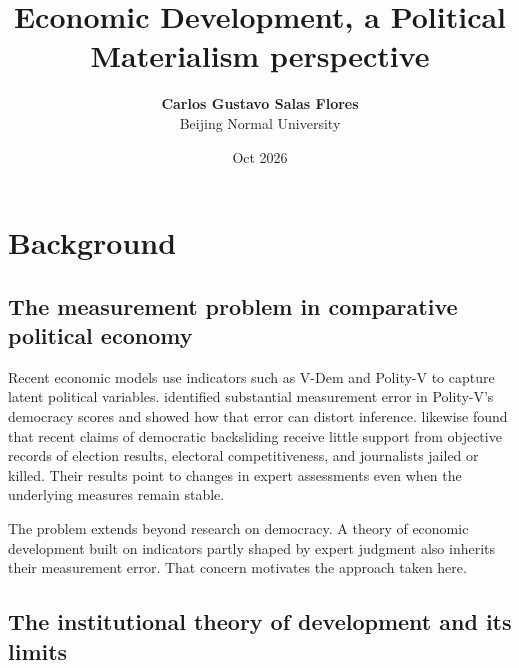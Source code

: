 \documentclass[11pt]{article}
\title{\textbf{Economic Development, a Political Materialism perspective}}
\author{\textbf{Carlos Gustavo Salas Flores} \\ \small Beijing Normal University}
\date{Oct 2026}
\begin{document}
\maketitle

\section{Background}
\label{sec:background}

\subsection{The measurement problem in comparative political economy}

Recent economic models use indicators such as V-Dem and Polity-V to capture latent political variables. \textcite{treier_jackman_2008} identified substantial measurement error in Polity-V's democracy scores and showed how that error can distort inference. \textcite{little_meng_2024} likewise found that recent claims of democratic backsliding receive little support from objective records of election results, electoral competitiveness, and journalists jailed or killed. Their results point to changes in expert assessments even when the underlying measures remain stable.

The problem extends beyond research on democracy. A theory of economic development built on indicators partly shaped by expert judgment also inherits their measurement error. That concern motivates the approach taken here.

\subsection{The institutional theory of development and its limits}
\end{document}
